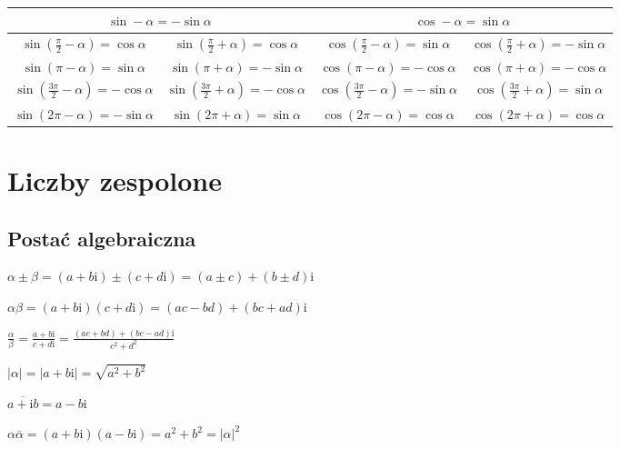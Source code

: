 \documentclass[a5paper,8pt]{extarticle}
\newcommand{\mi}{\mathrm{i}}
\begin{document}
\begin{center}
\begin{tabular}{ c | c | c | c }
	\multicolumn{2}{c|}{$ \sin -\alpha = -\sin \alpha $} &
	\multicolumn{2}{c}{$ \cos -\alpha = \sin \alpha $} \\ \hline

	$ \sin \left( \frac{\pi}{2} - \alpha \right) = \cos \alpha $ &
	$ \sin \left( \frac{\pi}{2} + \alpha \right) = \cos \alpha $ &
	$ \cos \left( \frac{\pi}{2} - \alpha \right) = \sin \alpha $ &
	$ \cos \left( \frac{\pi}{2} + \alpha \right) = -\sin \alpha $ \\

	$ \sin \left( \pi - \alpha \right) = \sin \alpha $ &
	$ \sin \left( \pi + \alpha \right) = -\sin \alpha $ &
	$ \cos \left( \pi - \alpha \right) = -\cos \alpha $ &
	$ \cos \left( \pi + \alpha \right) = -\cos \alpha $ \\
	
	\hline

	$ \sin \left( \frac{3\pi}{2} - \alpha \right) = -\cos \alpha $ &
	$ \sin \left( \frac{3\pi}{2} + \alpha \right) = -\cos \alpha $ &
	$ \cos \left( \frac{3\pi}{2} - \alpha \right) = -\sin \alpha $ &
	$ \cos \left( \frac{3\pi}{2} + \alpha \right) = \sin \alpha $ \\

	$ \sin \left( 2\pi - \alpha \right) = -\sin \alpha $ &
	$ \sin \left( 2\pi + \alpha \right) = \sin \alpha $ &
	$ \cos \left( 2\pi - \alpha \right) = \cos \alpha $ &
	$ \cos \left( 2\pi + \alpha \right) = \cos \alpha $
\end{tabular}
\end{center}

\section{Liczby zespolone}

\subsection{Postać algebraiczna}
\begin{description}
	\item $ \alpha \pm \beta = \left( a + b\mi \right) \pm \left( c + d\mi \right) 
	= \left( a \pm c \right) + \left( b \pm d \right)\mi$
	\item $ \alpha\beta = \left( a + b\mi \right) \left( c + d\mi \right) 
	= \left( ac - bd \right) + \left( bc + ad \right)\mi$
	\item $ \frac{\alpha}{\beta} = \frac{a + b\mi}{c + d\mi} = \frac{(ac + bd) + (bc - ad)\mi}{c^2 + d^2} $
	\item[Norma] $ |\alpha| = |a + b\mi| = \sqrt{a^2 + b^2} $
	\item[Sprzężenie] $ \overline{a + \mi b} = a - b\mi $
	\item $ \alpha\overline{\alpha} = (a + b\mi)(a - b\mi) = a^2 + b^2 = |\alpha|^2 $
\end{description}
\end{document}
